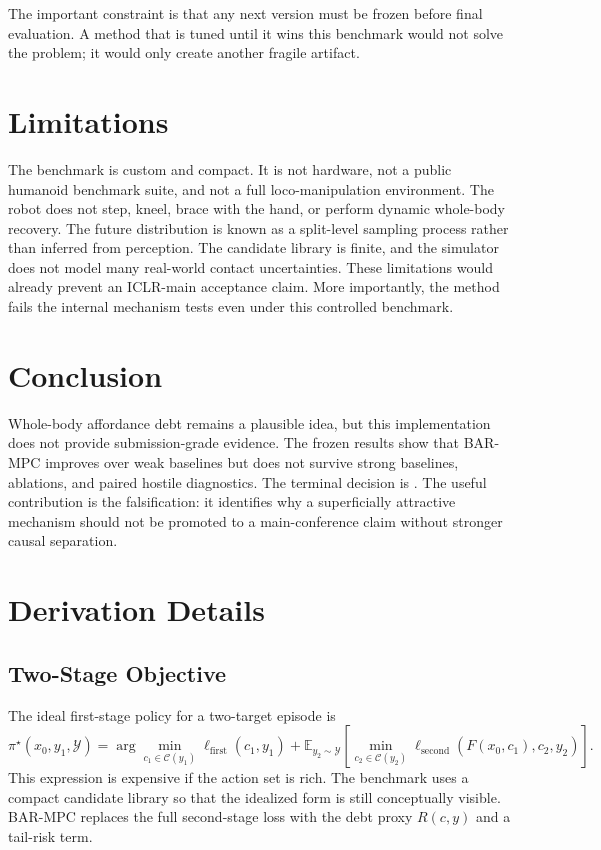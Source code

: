 \documentclass{article}
\newcommand{\method}{\textsc{BAR-MPC}}
\newcommand{\candidateSet}{\mathcal{C}}
\newcommand{\futureSet}{\mathcal{Y}}
\newcommand{\state}{x}
\newcommand{\target}{y}
\begin{document}
The important constraint is that any next version must be frozen before final evaluation. A method that is tuned until it wins this benchmark would not solve the problem; it would only create another fragile artifact.

\section{Limitations}



The benchmark is custom and compact. It is not hardware, not a public humanoid benchmark suite, and not a full loco-manipulation environment. The robot does not step, kneel, brace with the hand, or perform dynamic whole-body recovery. The future distribution is known as a split-level sampling process rather than inferred from perception. The candidate library is finite, and the simulator does not model many real-world contact uncertainties. These limitations would already prevent an ICLR-main acceptance claim. More importantly, the method fails the internal mechanism tests even under this controlled benchmark.

\section{Conclusion}

Whole-body affordance debt remains a plausible idea, but this implementation does not provide submission-grade evidence. The frozen results show that \method{} improves over weak baselines but does not survive strong baselines, ablations, and paired hostile diagnostics. The terminal decision is \PaperDecision{}. The useful contribution is the falsification: it identifies why a superficially attractive mechanism should not be promoted to a main-conference claim without stronger causal separation.

\clearpage
\appendix

\section{Derivation Details}

\subsection{Two-Stage Objective}

The ideal first-stage policy for a two-target episode is
\begin{equation}
  \pi^\star(\state_0,\target_1,\futureSet)
  =\arg\min_{c_1\in\candidateSet(\target_1)}
  \ell_{\mathrm{first}}(c_1,\target_1)
  +\mathbb{E}_{\target_2\sim\futureSet}
  \left[
    \min_{c_2\in\candidateSet(\target_2)}
    \ell_{\mathrm{second}}(F(\state_0,c_1),c_2,\target_2)
  \right].
\end{equation}
This expression is expensive if the action set is rich. The benchmark uses a compact candidate library so that the idealized form is still conceptually visible. \method{} replaces the full second-stage loss with the debt proxy $R(c,y)$ and a tail-risk term.
\end{document}
